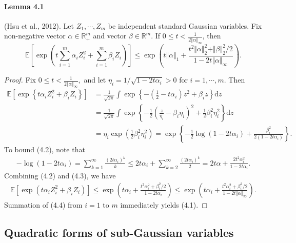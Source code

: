 \documentclass{article}
\newcommand{\E}{\mathbb{E}}
\begin{document}
\paragraph{Lemma 4.1} (Hsu et al., 2012). Let $Z_1,\cdots,Z_m$ be independent standard Gaussian variables. Fix non-negative vector $\alpha\in\mathbb{R}^m_+$ and vector $\beta\in\mathbb{R}^m.$ If $0\leq t < \frac{1}{2\Vert\alpha\Vert_\infty}$, then
\begin{equation*}
	\mathbb{E}\left[\exp\left(t\sum_{i=1}^m\alpha_iZ_i^2 + \sum_{i=1}^m\beta_iZ_i\right)\right]\leq\exp\left(t\Vert\alpha\Vert_1 + \frac{t^2\Vert\alpha\Vert_2^2 + \Vert\beta\Vert_2^2/2}{1-2t\Vert\alpha\Vert_\infty}\right).\tag{4.1}
\end{equation*}
\begin{proof}
Fix $0\leq t < \frac{1}{2\Vert\alpha\Vert_\infty},$ and let $\eta_i = {1}/\sqrt{1-2t\alpha_i} > 0$ for $i=1,\cdots,m$. Then
\begin{align*}
	\E\left[\exp\left\{t\alpha_iZ_i^2 + \beta_iZ_i\right\}\right] &= \frac{1}{\sqrt{2\pi}}\int\exp\left\{-\left(\frac{1}{2}-t\alpha_i\right)z^2 + \beta_iz\right\}\mathrm{d}z\\
	&= \frac{1}{\sqrt{2\pi}}\int\exp\left\{-\frac{1}{2}\left(\frac{z}{\eta_i} - \beta_i\eta_i\right)^2 + \frac{1}{2}\beta_i^2\eta_i^2\right\}\mathrm{d}z\\
	&= \eta_i\exp\left(\frac{1}{2}\beta_i^2\eta_i^2\right) = \exp\left\{-\frac{1}{2}\log(1-2t\alpha_i) + \frac{\beta_i^2}{2(1-2t\alpha_i)}\right\}.\tag{4.2}
\end{align*}
To bound (4.2), note that
\begin{align*}
	-\log(1-2t\alpha_i) = \sum_{k=1}^\infty\frac{(2t\alpha_i)^k}{k}\leq 2t\alpha_i + \sum_{k=2}^\infty\frac{(2t\alpha_i)^k}{2} = 2t\alpha + \frac{2t^2\alpha_i^2}{1-2t\alpha_i}.\tag{4.3}
\end{align*}
Combining (4.2) and (4.3), we have
\begin{align*}
	\E\left[\exp\left(t\alpha_iZ_i^2 + \beta_iZ_i\right)\right]\leq\exp\left(t\alpha_i+\frac{t^2\alpha_i^2 + \beta_i^2/2}{1-2t\alpha_i}\right)\leq\exp\left(t\alpha_i+\frac{t^2\alpha_i^2 + \beta_i^2/2}{1-2t\Vert\alpha\Vert_\infty}\right).\tag{4.4}
\end{align*}
Summation of (4.4) from $i=1$ to $m$ immediately yields (4.1).
\end{proof}
\subsection{Quadratic forms of sub-Gaussian variables}
\end{document}
